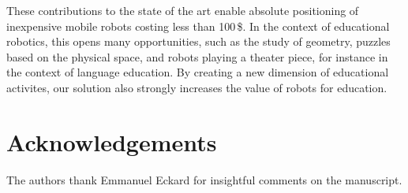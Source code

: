 \documentclass[letterpaper, 10pt, conference]{ieeeconf}
\begin{document}
These contributions to the state of the art enable absolute positioning of inexpensive mobile robots costing less than 100\,\$.
In the context of educational robotics, this opens many opportunities, such as the study of geometry, puzzles based on the physical space, and robots playing a theater piece, for instance in the context of language education.
By creating a new dimension of educational activites, our solution also strongly increases the value of robots for education.

\section{Acknowledgements}

The authors thank Emmanuel Eckard for insightful comments on the manuscript.



\end{document}

